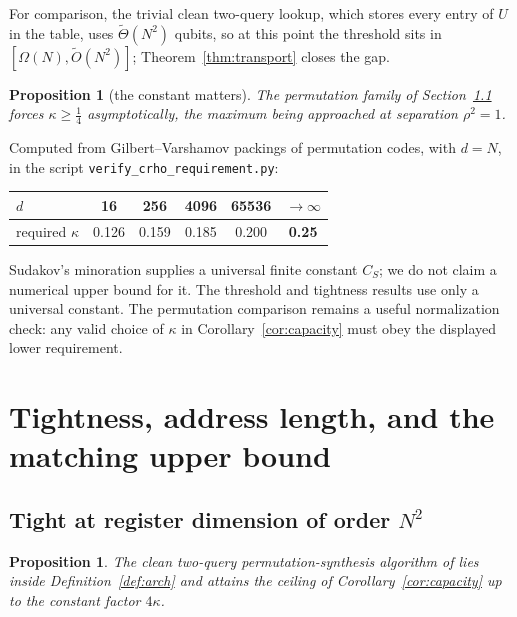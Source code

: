 \documentclass[11pt,a4paper]{article}
\theoremstyle{plain}
\newtheorem{proposition}[theorem]{Proposition}
\theoremstyle{definition}
\theoremstyle{remark}
\begin{document}
For comparison, the trivial clean two-query lookup, which stores every entry of $U$ in the
table, uses $\tilde\Theta(N^2)$ qubits, so at this point the threshold sits in
$[\Omega(N),\tilde O(N^2)]$; Theorem~\ref{thm:transport} closes the gap.

\begin{proposition}[the constant matters]\label{prop:constant}
The permutation family of Section~\ref{sec:tight} forces $\kappa\ge\tfrac14$ asymptotically, the
maximum being approached at separation $\rho^2=1$.
\end{proposition}

Computed from Gilbert--Varshamov packings of permutation codes, with $d=N$, in the script
\nolinkurl{verify_crho_requirement.py}:
\begin{center}
\begin{tabular}{lccccc}
\toprule
$d$ & 16 & 256 & 4096 & 65536 & $\to\infty$\\
\midrule
required $\kappa$ & 0.126 & 0.159 & 0.185 & 0.200 & \textbf{0.25}\\
\bottomrule
\end{tabular}
\end{center}
Sudakov's minoration supplies a universal finite constant $C_S$; we do not claim
a numerical upper bound for it. The threshold and tightness results use only a universal
constant. The permutation comparison remains a useful normalization check: any valid
choice of $\kappa$ in Corollary~\ref{cor:capacity} must obey the displayed lower requirement.

\section{Tightness, address length, and the matching upper bound}\label{sec:six}

\subsection{Tight at register dimension of order \texorpdfstring{$N^2$}{N squared}}\label{sec:tight}

\begin{proposition}\label{prop:dlm}
The clean two-query permutation-synthesis algorithm of \cite{DLM26} lies inside
Definition~\ref{def:arch} and attains the ceiling of Corollary~\ref{cor:capacity} up to the
constant factor $4\kappa$.
\end{proposition}
\end{document}
